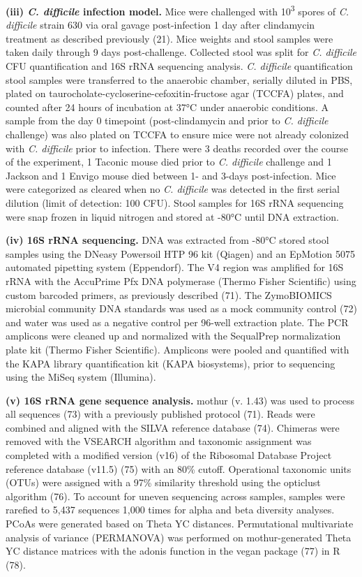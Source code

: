 \documentclass[11pt,]{article}
\begin{document}
\textbf{(iii) \emph{C. difficile} infection model.} Mice were challenged
with 10\textsuperscript{3} spores of \emph{C. difficile} strain 630 via
oral gavage post-infection 1 day after clindamycin treatment as
described previously (21). Mice weights and stool samples were taken
daily through 9 days post-challenge. Collected stool was split for
\emph{C. difficile} CFU quantification and 16S rRNA sequencing analysis.
\emph{C. difficile} quantification stool samples were transferred to the
anaerobic chamber, serially diluted in PBS, plated on
taurocholate-cycloserine-cefoxitin-fructose agar (TCCFA) plates, and
counted after 24 hours of incubation at 37°C under anaerobic conditions.
A sample from the day 0 timepoint (post-clindamycin and prior to
\emph{C. difficile} challenge) was also plated on TCCFA to ensure mice
were not already colonized with \emph{C. difficile} prior to infection.
There were 3 deaths recorded over the course of the experiment, 1
Taconic mouse died prior to \emph{C. difficile} challenge and 1 Jackson
and 1 Envigo mouse died between 1- and 3-days post-infection. Mice were
categorized as cleared when no \emph{C. difficile} was detected in the
first serial dilution (limit of detection: 100 CFU). Stool samples for
16S rRNA sequencing were snap frozen in liquid nitrogen and stored at
-80°C until DNA extraction.

\textbf{(iv) 16S rRNA sequencing.} DNA was extracted from -80°C stored
stool samples using the DNeasy Powersoil HTP 96 kit (Qiagen) and an
EpMotion 5075 automated pipetting system (Eppendorf). The V4 region was
amplified for 16S rRNA with the AccuPrime Pfx DNA polymerase (Thermo
Fisher Scientific) using custom barcoded primers, as previously
described (71). The ZymoBIOMICS microbial community DNA standards was
used as a mock community control (72) and water was used as a negative
control per 96-well extraction plate. The PCR amplicons were cleaned up
and normalized with the SequalPrep normalization plate kit (Thermo
Fisher Scientific). Amplicons were pooled and quantified with the KAPA
library quantification kit (KAPA biosystems), prior to sequencing using
the MiSeq system (Illumina).

\textbf{(v) 16S rRNA gene sequence analysis.} mothur (v. 1.43) was used
to process all sequences (73) with a previously published protocol (71).
Reads were combined and aligned with the SILVA reference database (74).
Chimeras were removed with the VSEARCH algorithm and taxonomic
assignment was completed with a modified version (v16) of the Ribosomal
Database Project reference database (v11.5) (75) with an 80\% cutoff.
Operational taxonomic units (OTUs) were assigned with a 97\% similarity
threshold using the opticlust algorithm (76). To account for uneven
sequencing across samples, samples were rarefied to 5,437 sequences
1,000 times for alpha and beta diversity analyses. PCoAs were generated
based on Theta YC distances. Permutational multivariate analysis of
variance (PERMANOVA) was performed on mothur-generated Theta YC distance
matrices with the adonis function in the vegan package (77) in R (78).
\end{document}

